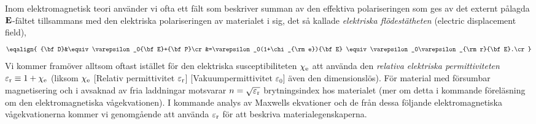 {Inom elektromagnetisk teori anv{\"a}nder vi ofta ett f{\"a}lt som beskriver
summan av den effektiva polariseringen som ges av det externt p{\aa}lagda
${\bf E}$-f{\"a}ltet tillsammans med den elektriska polariseringen av
materialet i sig, det s{\aa} kallade {\it elektriska fl{\"o}dest{\"a}theten}
(electric displacement field),
$$
  \eqalign{
    {\bf D}&\equiv\varepsilon_0{\bf E}+{\bf P}\cr
      &=\varepsilon_0(1+\chi_{\rm e}){\bf E}
       \equiv\varepsilon_0\varepsilon_{\rm r}{\bf E}.\cr
  }
$$
Vi kommer fram{\"o}ver alltsom oftast ist{\"a}llet f{\"o}r den elektriska
susceptibiliteten $\chi_{\rm e}$ att anv{\"a}nda den {\it relativa elektriska
permittiviteten} $\varepsilon_{\rm r}\equiv 1+\chi_{\rm e}$ (liksom
$\chi_{\rm e}$
[Relativ permittivitet $\varepsilon_{\rm r}$]
[Vakuumpermittivitet $\varepsilon_0$]
{\"a}ven den dimensionsl{\"o}s). F{\"o}r material med
f{\"o}rsumbar magnetisering och i avsaknad av fria laddningar motsvarar
$n=\sqrt{\varepsilon_{\rm r}}$ brytningsindex hos materialet (mer om detta
i kommande f{\"o}rel{\"a}sning om den elektromagnetiska v{\aa}gekvationen).
I kommande analys av Maxwells ekvationer och de fr{\aa}n dessa f{\"o}ljande
elektromagnetiska v{\aa}gekvationerna kommer vi genomg{\aa}ende att anv{\"a}nda
$\varepsilon_{\rm r}$ f{\"o}r att beskriva materialegenskaperna.
\vfill\eject

}
